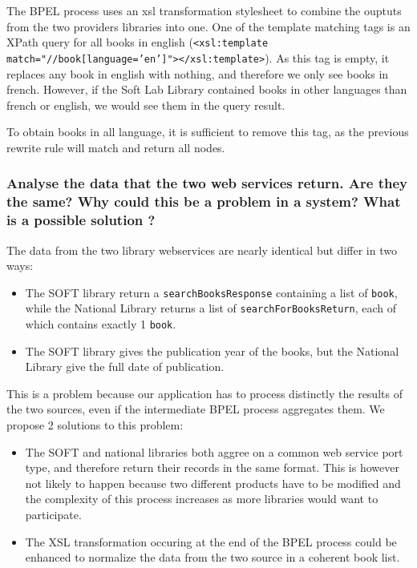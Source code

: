 The BPEL process uses an xsl transformation stylesheet to combine the ouptuts from the two providers libraries into one. One of the template matching tags is an XPath query for all books in english (\texttt{<xsl:template match="//book[language='en']"></xsl:template>}). As this tag is empty, it replaces any book in english with nothing, and therefore we only see books in french. However, if the Soft Lab Library contained books in other languages than french or english, we would see them in the query result.

To obtain books in all language, it is sufficient to remove this tag, as the previous rewrite rule will match and return all nodes.

\subsubsection{Analyse the data that the two web services return. Are they the same? Why could this be a problem in a system? What is a possible solution ?}

The data from the two library webservices are nearly identical but differ in two ways:
\begin{itemize}
  \item The SOFT library return a \texttt{searchBooksResponse} containing a list of \texttt{book}, while the National Library returns a list of \texttt{searchForBooksReturn}, each of which contains exactly 1 \texttt{book}.
  \item The SOFT library gives the publication year of the books, but the National Library give the full date of publication.
\end{itemize}

This is a problem because our application has to process distinctly the results of the two sources, even if the intermediate BPEL process aggregates them. We propose 2 solutions to this problem:

\begin{itemize}
  \item The SOFT and national libraries both aggree on a common web service port type, and therefore return their records in the same format. This is however not likely to happen because two different products have to be modified and the complexity of this process increases as more libraries would want to participate.
  \item The XSL transformation occuring at the end of the BPEL process could be enhanced to normalize the data from the two source in a coherent book list.
\end{itemize}


